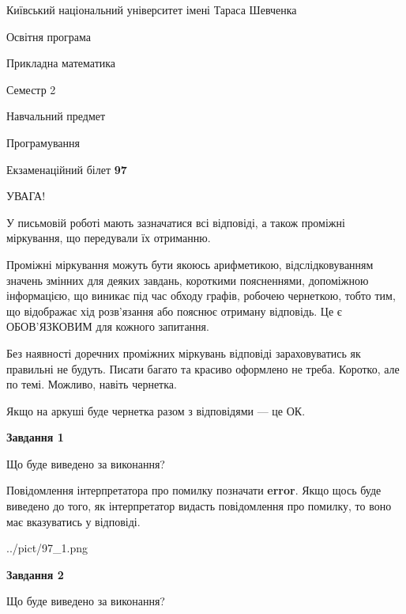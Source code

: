 \documentclass[12pt, ukrainian]{article}
\begin{document}
{{\begin {small}\par
{ \center  Київський національний університет імені Тараса Шевченка \par}
{\parbox {5 cm}{Освітня програма \hfill}{\parbox {7 cm}{Прикладна математика \hfill}}\parbox {6 cm}{\hfill Семестр 2}}\par
{\parbox {5 cm} {Навчальний предмет \hfill}\parbox {7 cm}{Програмування \hfill}\parbox {6cm}{\hfill}\par}\vspace{-7pt} \end{small}}{\center Екзаменаційний білет \No \textbf
{ 97 }\par}}
{
\begin {large}
УВАГА!

У письмовій роботі мають зазначатися всі відповіді, а також проміжні міркування, що передували їх отриманню.

Проміжні міркування можуть бути якоюсь арифметикою, відслідковуванням зна\-чень змінних для деяких завдань,
короткими поясненнями, допоміжною інформацією, що виникає під час обходу графів, робочею чернеткою,
тобто тим, що відображає хід розв’язання або пояснює отриману відповідь.
Це є ОБОВ’ЯЗКОВИМ для кожного запитання.

Без наявності доречних проміжних міркувань відповіді зараховуватись як правиль\-ні не будуть.
Писати багато та красиво оформлено не треба. Коротко, але по темі. Можли\-во, навіть чернетка.

Якщо на аркуші буде чернетка разом з відповідями --- це ОК.

\newpage

{\begin {center}\textbf{Завдання 1}\end {center}}\par
Що буде виведено за виконання?

Повідомлення інтерпретатора про помилку позначати \textbf{error}.
Якщо щось буде виведено до того, як інтерпретатор видасть повідомлення про помилку, 
то воно має вказуватись у відповіді. \par


\begin{center}
	{../pict/97_1.png}
\end{center}
\newpage

{\begin {center}\textbf{Завдання 2}\end {center}}\par
Що буде виведено за виконання?


\end{large}}
\end{document}
